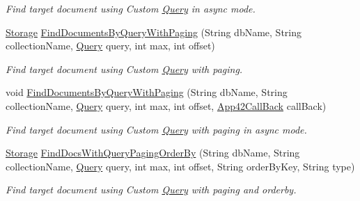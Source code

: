 \begin{DoxyCompactItemize}
\begin{DoxyCompactList}\small\item\em Find target document using Custom \hyperlink{classcom_1_1shephertz_1_1app42_1_1paas_1_1sdk_1_1csharp_1_1storage_1_1_query}{Query} in async mode. \end{DoxyCompactList}\item 
\hyperlink{classcom_1_1shephertz_1_1app42_1_1paas_1_1sdk_1_1csharp_1_1storage_1_1_storage}{Storage} \hyperlink{classcom_1_1shephertz_1_1app42_1_1paas_1_1sdk_1_1csharp_1_1storage_1_1_storage_service_a8b676fcf53c0cd5710653f21a204c91b}{Find\+Documents\+By\+Query\+With\+Paging} (String db\+Name, String collection\+Name, \hyperlink{classcom_1_1shephertz_1_1app42_1_1paas_1_1sdk_1_1csharp_1_1storage_1_1_query}{Query} query, int max, int offset)
\begin{DoxyCompactList}\small\item\em Find target document using Custom \hyperlink{classcom_1_1shephertz_1_1app42_1_1paas_1_1sdk_1_1csharp_1_1storage_1_1_query}{Query} with paging. \end{DoxyCompactList}\item 
void \hyperlink{classcom_1_1shephertz_1_1app42_1_1paas_1_1sdk_1_1csharp_1_1storage_1_1_storage_service_a0ba01498ba4104aab41af60f892599d9}{Find\+Documents\+By\+Query\+With\+Paging} (String db\+Name, String collection\+Name, \hyperlink{classcom_1_1shephertz_1_1app42_1_1paas_1_1sdk_1_1csharp_1_1storage_1_1_query}{Query} query, int max, int offset, \hyperlink{interfacecom_1_1shephertz_1_1app42_1_1paas_1_1sdk_1_1csharp_1_1_app42_call_back}{App42\+Call\+Back} call\+Back)
\begin{DoxyCompactList}\small\item\em Find target document using Custom \hyperlink{classcom_1_1shephertz_1_1app42_1_1paas_1_1sdk_1_1csharp_1_1storage_1_1_query}{Query} with paging in async mode. \end{DoxyCompactList}\item 
\hyperlink{classcom_1_1shephertz_1_1app42_1_1paas_1_1sdk_1_1csharp_1_1storage_1_1_storage}{Storage} \hyperlink{classcom_1_1shephertz_1_1app42_1_1paas_1_1sdk_1_1csharp_1_1storage_1_1_storage_service_acc6ada4ecec3f56f148d109270406252}{Find\+Docs\+With\+Query\+Paging\+Order\+By} (String db\+Name, String collection\+Name, \hyperlink{classcom_1_1shephertz_1_1app42_1_1paas_1_1sdk_1_1csharp_1_1storage_1_1_query}{Query} query, int max, int offset, String order\+By\+Key, String type)
\begin{DoxyCompactList}\small\item\em Find target document using Custom \hyperlink{classcom_1_1shephertz_1_1app42_1_1paas_1_1sdk_1_1csharp_1_1storage_1_1_query}{Query} with paging and orderby. \end{DoxyCompactList}\item 

\end{DoxyCompactItemize}
